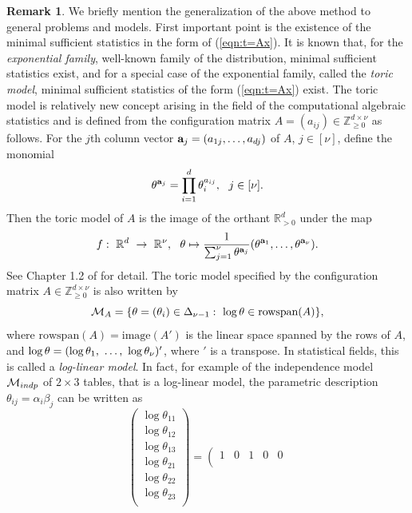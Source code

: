 \documentclass[12pt]{article}
\theoremstyle{definition}
\newtheorem{Remark}[Theorem]{Remark}
\def\Ba{{\bf a}}
\def\Btheta{{\bf \theta}}
\begin{document}
\begin{Remark}
We briefly mention the generalization of the above method to general problems
 and models. First important point is the existence of the
 minimal sufficient statistics in the form of (\ref{eqn:t=Ax}). 
It is known that, 
for the {\it exponential family}, well-known family of the distribution, 
minimal sufficient statistics exist, and 
for a special case of the exponential family, called the {\it toric
 model}, minimal sufficient statistics of the form (\ref{eqn:t=Ax})
 exist. 
The toric model is relatively new concept arising in the field of the
 computational algebraic statistics and is 
defined from the configuration matrix $A = (a_{ij}) \in
 \mathbb{Z}_{\geq 0}^{d\times \nu}$ as follows. 
For the $j$th column vector $\Ba_j = (a_{1j},\ldots,a_{dj})$ of $A$, $j
 \in [\nu]$, define the monomial
\[
 \Btheta^{\Ba_j} = \prod_{i = 1}^d\theta_i^{a_{ij}},\ \ j \in [\nu].
\]
Then the toric model of $A$ is the image of the orthant $\mathbb{R}_{>
 0}^d$ under the map
\[
 f:\ \mathbb{R}^d\ \rightarrow\ \mathbb{R}^{\nu},\ \ \Btheta \mapsto
 \frac{1}{\sum_{j=1}^{\nu}\Btheta^{\Ba_j}}(\Btheta^{\Ba_1},\ldots,\Btheta^{\Ba_{\nu}}).
\]
See Chapter 1.2 of \cite{Pacher-Sturmfels} for detail. 
The toric model specified by the configuration matrix $A \in
 \mathbb{Z}_{\geq 0}^{d\times \nu}$ is also written by
\[
 {\cal M}_A = \{\Btheta = (\theta_i) \in \Delta_{\nu-1}:\ \log \Btheta \in
 \mbox{rowspan}(A)\},
\]
where $\mbox{rowspan}(A) = \mbox{image}(A')$ 
is the linear space spanned by the rows of
 $A$, and $\log\Btheta = (\log \theta_1,\ \ldots,\ \log\theta_{\nu})'$,
 where ${}'$ is a transpose. In
 statistical fields, this is called a {\it log-linear model}. In fact,
 for example of the independence model ${\cal M}_{indp}$ of $2\times 3$
 tables, that is a log-linear model, the parametric description
 $\theta_{ij} = \alpha_i\beta_j$ can
 be written as
\[
\left(\begin{array}{c}
\log\theta_{11}\\
\log\theta_{12}\\
\log\theta_{13}\\
\log\theta_{21}\\
\log\theta_{22}\\
\log\theta_{23}\\
\end{array}
\right) = \left(\begin{array}{ccccc}
1 & 0 & 1 & 0 & 0\\

\end{array}\]
\end{Remark}
\end{document}
